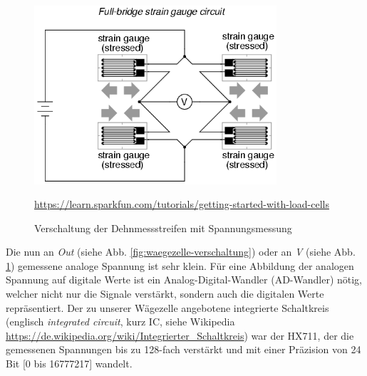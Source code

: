\begin{figure}[H]
    \center
    \includegraphics[width=9cm]{Bilder/waegezelle-full.png}\\
    \caption{Verschaltung der Dehnmessstreifen mit Spannungsmessung}
    \begin{flushleft} \quelle\url{https://learn.sparkfun.com/tutorials/getting-started-with-load-cells} \end{flushleft}
    \label{fig:waegezelle-full}
\end{figure}
\noindent
Die nun an \textit{Out} (siehe Abb. \ref{fig:waegezelle-verschaltung}) oder an \textit{V} (siehe Abb. \ref{fig:waegezelle-full}) gemessene analoge Spannung ist sehr klein. Für eine Abbildung der analogen Spannung auf digitale Werte ist ein Analog-Digital-Wandler (AD-Wandler) nötig, welcher nicht nur die Signale verstärkt, sondern auch die digitalen Werte repräsentiert. Der zu unserer Wägezelle angebotene integrierte Schaltkreis (englisch \textit{integrated circuit}, kurz IC, siehe Wikipedia \url{https://de.wikipedia.org/wiki/Integrierter_Schaltkreis}) war der HX711, der die gemessenen Spannungen bis zu 128-fach verstärkt und mit einer Präzision von 24 Bit [0 bis 16777217] wandelt.
\newpage


